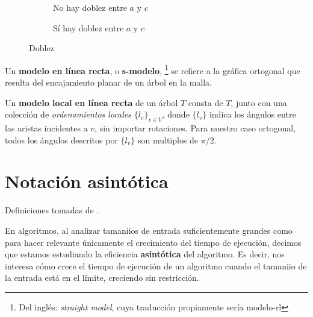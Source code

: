 \begin{figure}
  \begin{subfigure}{0.4\textwidth}
    \caption{No hay doblez entre $a$ y $c$}
  \end{subfigure}
  \begin{subfigure}{0.4\textwidth}
    \caption{S\'i hay doblez entre $a$ y $c$}
  \end{subfigure}
  \caption{Doblez}
\end{figure}

\begin{definition}
Un \textbf{modelo en l\'inea recta}\cite{minbends}, o \textbf{s-modelo}, \footnote{Del ingl\'es: \textit{straight model}, cuya traducci\'on propiamente ser\'ia modelo-rl} se refiere a la gr\'afica ortogonal que resulta del encajamiento planar de un \'arbol en la malla.
\end{definition}

\begin{definition}
Un \textbf{modelo local en l\'inea recta}\cite{paper} de un \'arbol $T$ consta de $T$, junto con una colecci\'on de \emph{ordenamientos locales} $\{l_v\}_{v\in V}$, donde $\{l_v\}$ indica los \'angulos entre las aristas incidentes a $v$, sin importar rotaciones. Para nuestro caso ortogonal, todos los \'angulos descritos por $\{l_v\}$ son multiplos de $\pi/2$.
\end{definition}

\section{Notaci\'on asint\'otica}

Definiciones tomadas de \cite{cormenetal}.

En algoritmos, al analizar tamaniios de entrada suficientemente grandes como para hacer relevante \'unicamente el crecimiento del tiempo de ejecuci\'on, decimos que estamos estudiando la eficiencia \textbf{asint\'otica} del algoritmo. Es decir, nos interesa c\'omo crece el tiempo de ejecuci\'on de un algoritmo cuando el tamaniio de la entrada est\'a en el l\'imite, creciendo sin restricci\'on.

